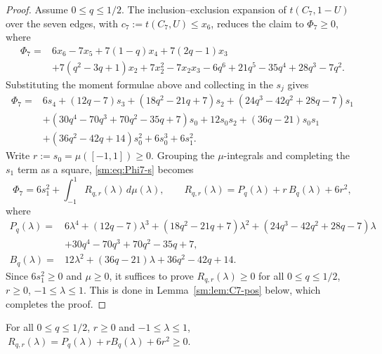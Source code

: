 \begin{proof}
Assume $0\le q\le1/2$.  The inclusion--exclusion expansion of
$t(C_7,1-U)$ over the seven edges, with $c_7:=t(C_7,U)\le x_6$, reduces the
claim to $\Phi_7\ge0$, where
\[
\begin{aligned}
   \Phi_7={}&6x_6-7x_5+7(1-q)x_4+7(2q-1)x_3\\
   &+7(q^{2}-3q+1)x_2+7x_2^{2}-7x_2x_3-6q^{6}+21q^{5}-35q^{4}+28q^{3}-7q^{2}.
\end{aligned}
\]
Substituting the moment formulae above and collecting in the $s_j$ gives
\begin{equation}\label{sm:eq:Phi7-s}
\begin{aligned}
   \Phi_7={}&6s_4+(12q-7)s_3+(18q^{2}-21q+7)s_2
             +(24q^{3}-42q^{2}+28q-7)s_1\\
   &+(30q^{4}-70q^{3}+70q^{2}-35q+7)s_0
     +12s_0s_2+(36q-21)s_0s_1\\
   &+(36q^{2}-42q+14)s_0^{2}+6s_0^{3}+6s_1^{2}.
\end{aligned}
\end{equation}
Write $r:=s_0=\mu([-1,1])\ge0$.  Grouping the $\mu$-integrals and completing
the $s_1$ term as a square, \eqref{sm:eq:Phi7-s} becomes
\begin{equation}\label{sm:eq:Phi7-int}
   \Phi_7=6s_1^{2}+\int_{-1}^{1}R_{q,r}(\lambda)\,d\mu(\lambda),
   \qquad
   R_{q,r}(\lambda)=P_q(\lambda)+r\,B_q(\lambda)+6r^{2},
\end{equation}
where
\[
\begin{aligned}
   P_q(\lambda)={}&6\lambda^{4}+(12q-7)\lambda^{3}+(18q^{2}-21q+7)\lambda^{2}
                    +(24q^{3}-42q^{2}+28q-7)\lambda\\
   &+30q^{4}-70q^{3}+70q^{2}-35q+7,\\
   B_q(\lambda)={}&12\lambda^{2}+(36q-21)\lambda+36q^{2}-42q+14 .
\end{aligned}
\]
Since $6s_1^{2}\ge0$ and $\mu\ge0$, it suffices to prove
$R_{q,r}(\lambda)\ge0$ for all $0\le q\le1/2$, $r\ge0$, $-1\le\lambda\le1$.
This is done in Lemma~\ref{sm:lem:C7-pos} below, which completes the proof.
\end{proof}

\begin{lemma}\label{sm:lem:C7-pos}
For all $0\le q\le1/2$, $r\ge0$ and $-1\le\lambda\le1$,
$\ R_{q,r}(\lambda)=P_q(\lambda)+rB_q(\lambda)+6r^{2}\ge0.$
\end{lemma}

